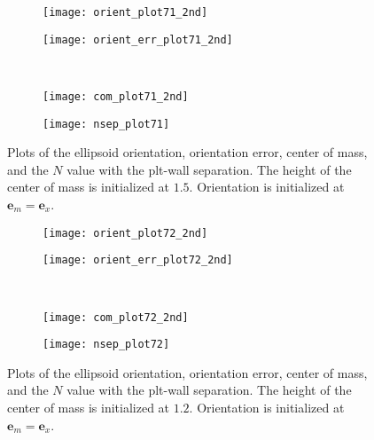 \documentclass{article}
\newcommand{\vect}[1]{\boldsymbol{\mathbf{#1}}}
\begin{document}
\begin{figure}[b]
  \centering
  \begin{subfigure}{0.49\textwidth}
    \texttt{[image: orient\_plot71\_2nd]}
  \end{subfigure}
  \hfill
  \begin{subfigure}{0.49\textwidth}
    \texttt{[image: orient\_err\_plot71\_2nd]}
  \end{subfigure}
  \\
  \begin{subfigure}{0.49\textwidth}
    \texttt{[image: com\_plot71\_2nd]}
  \end{subfigure}
  \hfill
  \begin{subfigure}{0.49\textwidth}
    \texttt{[image: nsep\_plot71]}
  \end{subfigure}  
  \caption{Plots of the ellipsoid orientation, orientation error,
    center of mass, and the $N$ value with the plt-wall
    separation. The height of the center of mass is initialized at
    $1.5$. Orientation is initialized at $\vect{e}_m =
    \vect{e}_x$.}
  \label{fig:plt71}
\end{figure}

\begin{figure}[b]
  \centering
  \begin{subfigure}{0.49\textwidth}
    \texttt{[image: orient\_plot72\_2nd]}
  \end{subfigure}
  \hfill
  \begin{subfigure}{0.49\textwidth}
    \texttt{[image: orient\_err\_plot72\_2nd]}
  \end{subfigure}
  \\
  \begin{subfigure}{0.49\textwidth}
    \texttt{[image: com\_plot72\_2nd]}
  \end{subfigure}
  \hfill
  \begin{subfigure}{0.49\textwidth}
    \texttt{[image: nsep\_plot72]}
  \end{subfigure}  
  \caption{Plots of the ellipsoid orientation, orientation error,
    center of mass, and the $N$ value with the plt-wall
    separation. The height of the center of mass is initialized at
    $1.2$. Orientation is initialized at $\vect{e}_m =
    \vect{e}_x$.}
  \label{fig:plt72}
\end{figure}
\end{document}
